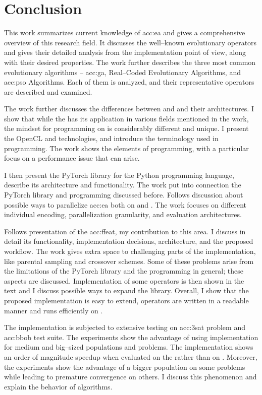 \chapter{Conclusion}
\label{chap:conclusion}

This work summarizes current knowledge of \acrlong*{acc:ea} and gives a comprehensive overview of this research field. It discusses the well--known evolutionary operators and gives their detailed analysis from the implementation point of view, along with their desired properties. The work further describes the three most common evolutionary algorithms -- \acrlong{acc:ga}, Real--Coded Evolutionary Algorithms, and \acrlong{acc:pso} Algorithms. Each of them is analyzed, and their representative operators are described and examined.

The work further discusses the differences between \cpu and \gpu and their architectures. I show that while the \gpu has its application in various fields mentioned in the work, the mindset for programming on \gpu is considerably different and unique. I present the OpenCL and \cuda technologies, and introduce the terminology used in \gpu programming. The work shows the elements of \cuda programming, with a particular focus on a performance issue that can arise. 

I then present the PyTorch library for the Python programming language, describe its architecture and functionality. The work put into connection the PyTorch library and \cuda programming discussed before. Follows discussion about possible ways to parallelize \acrlong{acc:ea} both on \cpu and \gpuns. The work focuses on different individual encoding, parallelization granularity, and evaluation architectures.

Follows presentation of the \acrfull{acc:ffeat}, my contribution to this area. I discuss in detail its functionality, implementation decisions, architecture, and the proposed workflow. The work gives extra space to challenging parts of the implementation, like parental sampling and crossover schemes. Some of these problems arise from the limitations of the PyTorch library and the \cuda programming in general; these aspects are discussed. Implementation of some operators is then shown in the text and I discuss possible ways to expand the library. Overall, I show that the proposed implementation is easy to extend, operators are written in a readable manner and runs efficiently on \gpuns.

The implementation is subjected to extensive testing on \acrshort{acc:3sat} problem and \acrshort{acc:bbob} test suite. The experiments show the advantage of using \cuda implementation for medium and big--sized populations and problems. The implementation shows an order of magnitude speedup when evaluated on the \gpu rather than on \cpuns. Moreover, the experiments show the advantage of a bigger population on some problems while leading to premature convergence on others. I discuss this phenomenon and explain the behavior of algorithms.

